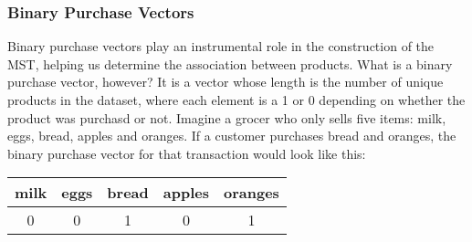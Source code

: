 \documentclass[a4paper,11pt]{article}
\begin{document}
\subsubsection{Binary Purchase Vectors}
Binary purchase vectors play an instrumental role in the construction of the MST, helping us determine the association between products. What is a binary purchase vector, however? It is a vector whose length is the number of unique products in the dataset, where each element is a 1 or 0 depending on whether the product was purchasd or not. Imagine a grocer who only sells five items: milk, eggs, bread, apples and oranges. If a customer purchases bread and oranges, the binary purchase vector for that transaction would look like this:
\begin{table}[H]
\centering
\begin{tabular}{@{}ccccc@{}}
\toprule
milk & eggs & bread & apples & oranges \\ \midrule
0    & 0    & 1     & 0      & 1       \\ \bottomrule
\end{tabular}
\end{table}
\end{document}

